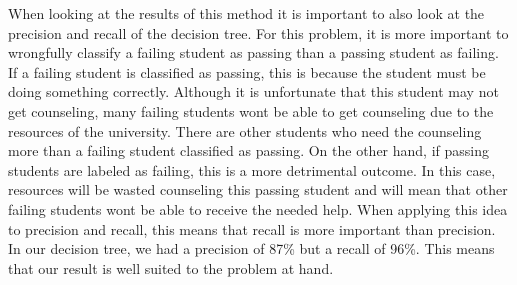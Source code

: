 \documentclass[12pt]{article}
\begin{document}
When looking at the results of this method it is important to also look at the precision and recall of the decision tree. For this problem, it is more important to wrongfully classify a failing student as passing than a passing student as failing. If a failing student is classified as passing, this is because the student must be doing something correctly. Although it is unfortunate that this student may not get counseling, many failing students wont be able to get counseling due to the resources of the university. There are other students who need the counseling more than a failing student classified as passing. On the other hand, if passing students are labeled as failing, this is a more detrimental outcome. In this case, resources will be wasted counseling this passing student and will mean that other failing students wont be able to receive the needed help. When applying this idea to precision and recall, this means that recall is more important than precision. In our decision tree, we had a precision of 87\% but a recall of 96\%. This means that our result is well suited to the problem at hand. 



\clearpage


\end{document}
